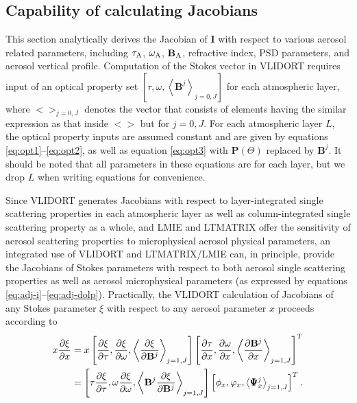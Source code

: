 \subsection{Capability of calculating Jacobians} \label{subsec:jacobian}

This section analytically derives the Jacobian of $\mathbf{I}$ with
respect to various aerosol related parameters, including $\tau_\text{A}$,
$\omega_\text{A}$, $\mathbf{B}_\text{A}$, refractive index, PSD parameters, and aerosol vertical
profile. Computation of the Stokes vector in VLIDORT requires input of
an optical property set $[\tau,\omega,\left<\mathbf{B}^j\right>_{j=0,J}]$ for
each atmospheric layer, where $<>_{j=0,J}$ denotes the vector that
consists of elements having the similar expression as that inside $<>$
but for $j=0, J$. For each atmospheric layer $L$, the optical property
inputs are assumed constant and are given by equations 
\eqref{eq:opt1}--\eqref{eq:opt2}, as well as equation \eqref{eq:opt3}
with $\mathbf{P}(\Theta)$ replaced by $\mathbf{B}^j$. 
It should be noted that all parameters
in these equations are for each layer, but we drop $L$ when writing
equations for convenience.

Since VLIDORT generates Jacobians with respect to layer-integrated
single scattering properties in each atmospheric layer as well as
column-integrated single scattering property as a whole, and LMIE and
LTMATRIX offer the sensitivity of aerosol scattering properties to
microphysical aerosol physical parameters, an integrated use of VLIDORT
and LTMATRIX/LMIE can, in principle, provide the Jacobians of Stokes
parameters with respect to both aerosol single scattering properties as
well as aerosol microphysical parameters (as expressed by equations
\eqref{eq:adj-i}--\eqref{eq:adj-dolp}). Practically, the VLIDORT
calculation of Jacobians of any Stokes parameter $\xi$ with respect to 
any aerosol parameter $x$ proceeds according to
\begin{equation}
\begin{split}
x\frac{\partial\xi}{\partial x} &=
  x\left[ \frac{\partial\xi}{\partial\tau}, \frac{\partial\xi}{\partial\omega}, 
          \left< \frac{\partial\xi}{\partial\mathbf{B}^j}\right>_{j=1,J}\right] 
  \left[ \frac{\partial\tau}{\partial x}, \frac{\partial\omega}{\partial x}, 
         \left< \frac{\partial\mathbf{B}^j}{\partial x}\right>_{j=1,J}\right]^T \\
  &= \left[ \tau \frac{\partial\xi}{\partial\tau}, \omega \frac{\partial\xi}{\partial\omega}, 
          \left< \mathbf{B}^j \frac{\partial\xi}{\partial\mathbf{B}^j}\right>_{j=1,J}\right]
     \left[ \phi_x, \varphi_x, \left< \pmb{\Psi}_x^j\right>_{j=1,J}
\right]^T. 
\end{split}
\label{eq:adj-x}
\end{equation}

